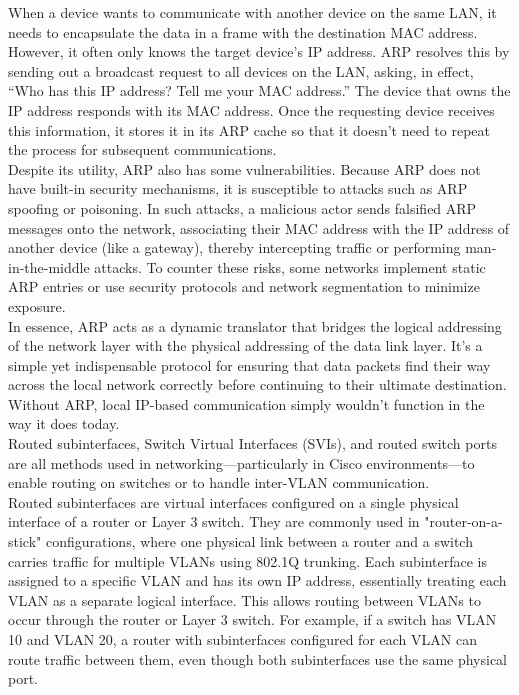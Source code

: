 \documentclass[parindent=0pt]{article}
\begin{document}
When a device wants to communicate with another device on the same LAN, it needs to encapsulate the data in a frame with the destination MAC address. However, it often only knows the target device’s IP address. ARP resolves this by sending out a broadcast request to all devices on the LAN, asking, in effect, “Who has this IP address? Tell me your MAC address.” The device that owns the IP address responds with its MAC address. Once the requesting device receives this information, it stores it in its ARP cache so that it doesn't need to repeat the process for subsequent communications.\\

Despite its utility, ARP also has some vulnerabilities. Because ARP does not have built-in security mechanisms, it is susceptible to attacks such as ARP spoofing or poisoning. In such attacks, a malicious actor sends falsified ARP messages onto the network, associating their MAC address with the IP address of another device (like a gateway), thereby intercepting traffic or performing man-in-the-middle attacks. To counter these risks, some networks implement static ARP entries or use security protocols and network segmentation to minimize exposure.\\

In essence, ARP acts as a dynamic translator that bridges the logical addressing of the network layer with the physical addressing of the data link layer. It's a simple yet indispensable protocol for ensuring that data packets find their way across the local network correctly before continuing to their ultimate destination. Without ARP, local IP-based communication simply wouldn't function in the way it does today.\\

Routed subinterfaces, Switch Virtual Interfaces (SVIs), and routed switch ports are all methods used in networking—particularly in Cisco environments—to enable routing on switches or to handle inter-VLAN communication.\\

Routed subinterfaces are virtual interfaces configured on a single physical interface of a router or Layer 3 switch. They are commonly used in "router-on-a-stick" configurations, where one physical link between a router and a switch carries traffic for multiple VLANs using 802.1Q trunking. Each subinterface is assigned to a specific VLAN and has its own IP address, essentially treating each VLAN as a separate logical interface. This allows routing between VLANs to occur through the router or Layer 3 switch. For example, if a switch has VLAN 10 and VLAN 20, a router with subinterfaces configured for each VLAN can route traffic between them, even though both subinterfaces use the same physical port.\\
\end{document}
